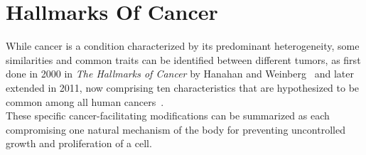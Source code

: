 \section{Hallmarks Of Cancer}\label{sec:hallmarks}
While cancer is a condition characterized by its predominant heterogeneity, some similarities and common traits can be identified between different tumors, as first done in 2000 in \textit{The Hallmarks of Cancer} by Hanahan and Weinberg~\cite{hallmarks-of-cancer} and later extended in 2011, now comprising ten characteristics that are hypothesized to be common among all human cancers~\cite{hallmarks-of-cancer-next-generation}.\\
These specific cancer-facilitating modifications can be summarized as each compromising one natural mechanism of the body for preventing uncontrolled growth and proliferation of a cell.
